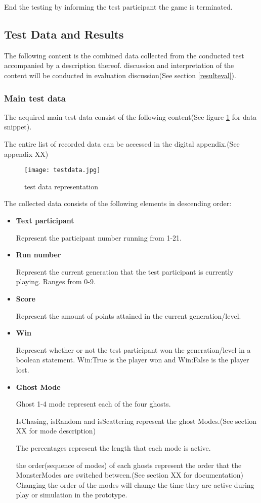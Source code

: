 End the testing by informing the test participant the game is terminated.



\newpage
\subsection{Test Data and Results}
The following content is the combined data collected from the conducted test accompanied by a description thereof. discussion and interpretation of the content will be conducted in evaluation discussion(See section \ref{resulteval}).

\subsubsection{Main test data}
The acquired main test data consist of the following content(See figure \ref{fig:testdata} for data snippet).

The entire list of recorded data can be accessed in the digital appendix.(See appendix XX)

\begin{figure}[!htbp]
\centering
\texttt{[image: testdata.jpg]}
\caption{test data representation}
\label{fig:testdata}
\end{figure}


\newpage

The collected data consists of the following elements in descending order:

\begin{itemize}
\item  \textbf{Text participant}

Represent the participant number running from 1-21.
\item  \textbf{Run number}

Represent the current generation that the test participant is currently playing. Ranges from 0-9.
\item  \textbf{Score}

Represent the amount of points attained in the current generation/level.
\item  \textbf{Win}

Represent whether or not the test participant won the generation/level in a boolean statement. Win:True is the player won and Win:False is the player lost.
\item  \textbf{Ghost Mode}

Ghost 1-4 mode represent each of the four ghosts.


IsChasing, isRandom and isScattering represent the ghost Modes.(See section XX for mode description)

The percentages represent the length that each mode is active.

the order(sequence of modes) of each ghosts represent the order that the MonsterModes are switched between.(See section XX for documentation) Changing the order of the modes will change the time they are active during play or simulation in the prototype.
\end{itemize}

